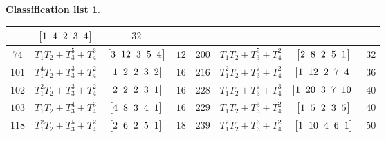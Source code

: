 \documentclass[10pt,a4paper]{amsart}
\theoremstyle{definition}
\newtheorem{class-list}[thm]{Classification list}
\numberwithin{equation}{section}
\begin{document}
\begin{class-list}
\begin{table}[t!]
\begin{tabu}{c|c|c|c||c|c|c|c}
&$\arraycolsep=1mm\begin{bmatrix}{1} & {4} & {2} & {3} & {4}\end{bmatrix}$&${32}$
\\
\hline
${74}$&${T_{1}T_{2}+T_{3}^{5}+T_{4}^{3}}$
&$\arraycolsep=1mm\begin{bmatrix}{3} & {12} & {3} & {5} & {4}\end{bmatrix}$&${12}$
&${200}$&${T_{1}T_{2}+T_{3}^{5}+T_{4}^{2}}$
&$\arraycolsep=1mm\begin{bmatrix}{2} & {8} & {2} & {5} & {1}\end{bmatrix}$&${32}$
\\
\hline
${101}$&${T_{1}^{4}T_{2}+T_{3}^{3}+T_{4}^{2}}$
&$\arraycolsep=1mm\begin{bmatrix}{1} & {2} & {2} & {3} & {2}\end{bmatrix}$&${16}$
&${216}$&${T_{1}^{2}T_{2}+T_{3}^{7}+T_{4}^{2}}$
&$\arraycolsep=1mm\begin{bmatrix}{1} & {12} & {2} & {7} & {4}\end{bmatrix}$&${36}$
\\
\hline
${102}$&${T_{1}^{2}T_{2}+T_{3}^{3}+T_{4}^{2}}$
&$\arraycolsep=1mm\begin{bmatrix}{2} & {2} & {2} & {3} & {1}\end{bmatrix}$&${16}$
&${228}$&${T_{1}T_{2}+T_{3}^{7}+T_{4}^{3}}$
&$\arraycolsep=1mm\begin{bmatrix}{1} & {20} & {3} & {7} & {10}\end{bmatrix}$&${40}$
\\
\hline
${103}$&${T_{1}T_{2}+T_{3}^{4}+T_{4}^{3}}$
&$\arraycolsep=1mm\begin{bmatrix}{4} & {8} & {3} & {4} & {1}\end{bmatrix}$&${16}$
&${229}$&${T_{1}T_{2}+T_{3}^{3}+T_{4}^{2}}$
&$\arraycolsep=1mm\begin{bmatrix}{1} & {5} & {2} & {3} & {5}\end{bmatrix}$&${40}$
\\
\hline
${118}$&${T_{1}^{2}T_{2}+T_{3}^{5}+T_{4}^{2}}$
&$\arraycolsep=1mm\begin{bmatrix}{2} & {6} & {2} & {5} & {1}\end{bmatrix}$&${18}$
&${239}$&${T_{1}^{2}T_{2}+T_{3}^{3}+T_{4}^{2}}$
&$\arraycolsep=1mm\begin{bmatrix}{1} & {10} & {4} & {6} & {1}\end{bmatrix}$&${50}$
\\
\hline
\end{tabu}%
\end{table}
\end{class-list}
\end{document}
